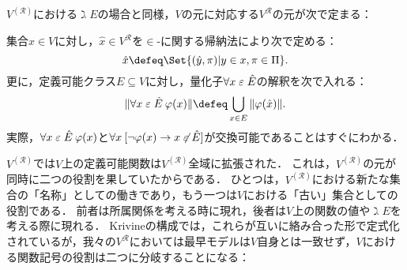 \documentclass[realisability.tex]{subfiles}
\begin{document}
$V^{(\mathcal{R})}$における$\gimel E$の場合と同様，$V$の元に対応する$V^{\mathcal{R}}$の元が次で定まる：
\begin{definition}
 集合$x \in V$に対し，$\hat{x} \in V^{\mathcal{R}}$を$\in$-に関する帰納法により次で定める：
 \[
  \hat{x} \defeq \Set{(\hat{y}, \pi) | y \in x, \pi \in \Pi}.
 \]
 更に，定義可能クラス$E \subseteq V$に対し，量化子$\forall x \mathrel{\varepsilon} \hat{E}$の解釈を次で入れる：
 \[
  \| \forall x \strin \hat{E} \: \varphi(x)\| \defeq \bigcup_{x \in E} \|\varphi(\hat{x})\|.
 \]
 実際，$\forall x \mathrel{\varepsilon} \hat{E}\: \varphi(x)$と$\forall x\:[\neg \varphi(x) \to x \not\mathrel{\varepsilon} \hat{E}]$が交換可能であることはすぐにわかる．
\end{definition}
$V^{(\mathcal{R})}$では$V$上の定義可能関数は$V^{(\mathcal{R})}$全域に拡張された．
これは，$V^{(\mathcal{R})}$の元が同時に二つの役割を果していたからである．
ひとつは，$V^{(\mathcal{R})}$における新たな集合の「名称」としての働きであり，もう一つは$V$における「古い」集合としての役割である．
前者は所属関係を考える時に現れ，後者は$V$上の関数の値や$\gimel E$を考える際に現れる．
Krivineの構成では，これらが互いに絡み合った形で定式化されているが，我々の$V^{\mathcal{R}}$においては最早モデルは$V$自身とは一致せず，$V$における関数記号の役割は二つに分岐することになる：
\end{document}
